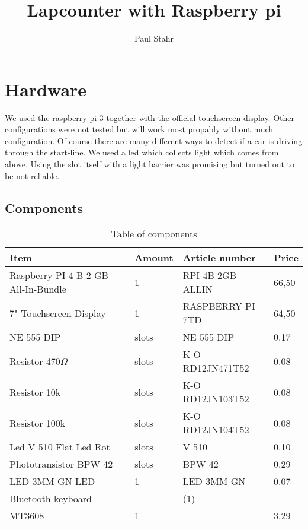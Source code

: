 \documentclass[11pt, a4paper, UKenglish, parskip=half+]{scrbook}
\author{Paul Stahr}
\title{Lapcounter with Raspberry pi}
\newcommand{\slots}{slots}
\begin{document}
\maketitle
\chapter{Hardware}
We used the raspberry pi 3 together with the official touchscreen-display. Other configurations were not tested but will work most propably without much configuration. Of course there are many different ways to detect if a car is driving through the start-line. We used a led which collects light which comes from above. Using the slot itself with a light barrier was promising but turned out to be not reliable.
\section{Components}
\begin{table}[H]
\begin{tabular}{l l l l}
Item& Amount & Article number & Price\\\hline
Raspberry PI 4 B 2 GB All-In-Bundle & 1 &RPI 4B 2GB ALLIN &66,50 \\
7" Touchscreen Display & 1 & RASPBERRY PI 7TD&64,50\\
NE 555 DIP & \slots &NE 555 DIP& 0.17 \\
Resistor 470$\Omega$ & \slots&K-O RD12JN471T52&0.08 \\
Resistor 10k & \slots& K-O RD12JN103T52 & 0.08\\
Resistor 100k & \slots& K-O RD12JN104T52& 0.08 \\
Led V 510 Flat Led Rot& \slots &V 510& 0.10 \\
Phototransistor BPW 42 & \slots& BPW 42& 0.29\\
LED 3MM GN LED & 1& LED 3MM GN& 0.07\\
Bluetooth keyboard& & (1) \\
MT3608 & 1& & 3.29\\
\end{tabular}
\caption{Table of components}
\end{table}

\end{document}
